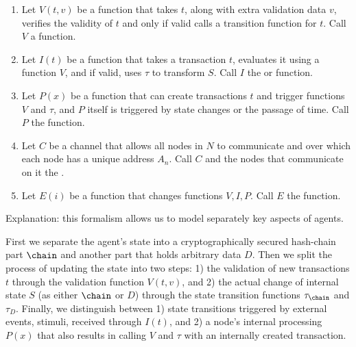 \documentclass[twocolumn,showpacs,
  nofootinbib,aps,superscriptaddress,
  eqsecnum,prd,notitlepage,showkeys,10pt]{revtex4-1}
\begin{document}
\begin{enumerate}
\begin{enumerate}
\end{enumerate}
\item Let $V(t,v)$ be a function that takes $t$, along with extra validation data $v$, verifies the validity of $t$ and only if valid calls a transition function for $t$. Call $V$ a  function.
\label{formalism:validation}
\item Let $I(t)$ be a function that takes a transaction $t$, evaluates it using a function $V$, and if valid, uses $\tau$ to transform $S$. Call $I$ the  or  function.
\item Let $P(x)$ be a function that can create transactions $t$ and trigger functions $V$ and $\tau$, and $P$ itself is triggered by state changes or the passage of time.  Call $P$ the  function.
\item Let $C$ be a channel that allows all nodes in $N$ to communicate and over which each node has a unique address $A_n$. Call $C$ and the nodes that communicate on it the .
\item Let $E(i)$ be a function that changes functions $V,I,P$.  Call $E$ the  function.
\end{enumerate}

Explanation: this formalism allows us to model separately key aspects of agents.

First we separate the agent's state into a cryptographically secured hash-chain part $\chain$ and another part that holds arbitrary data $D$. Then we split the process of updating the state into two steps: 1) the validation of new transactions $t$ through the validation function $V(t,v)$, and 2) the actual change of internal state $S$ (as either $\chain$ or $D$) through the state transition functions $\tau_\chain$ and $\tau_D$. Finally, we distinguish between 1) state transitions triggered by external events, stimuli, received through $I(t)$, and 2) a node's internal processing $P(x)$ that also results in calling $V$ and $\tau$ with an internally created transaction.
\end{document}
